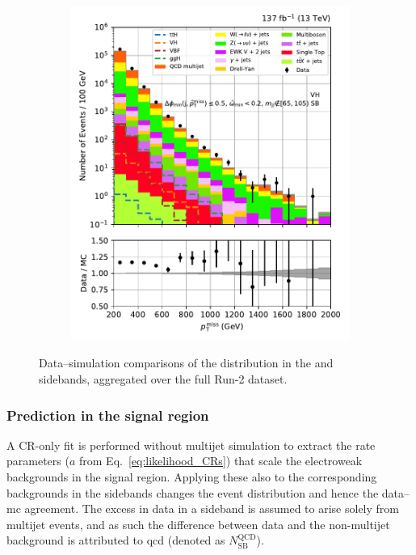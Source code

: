 \begin{figure}[htbp]
\begin{subfigure}[b]{0.45\textwidth}
        \includegraphics[width=\textwidth]{figures/region_plots/full_Run2/sideband/VH.pdf}
        \caption{\VH}
    \end{subfigure}
    \caption[Data--simulation comparisons of the \ptmiss distribution in the \ttH and \VH sidebands, aggregated over the full Run-2 dataset]{Data--simulation comparisons of the \ptmiss distribution in the \ttH and \VH sidebands, aggregated over the full Run-2 dataset.}
    \label{fig:htoinv_sb_yields_combRun2}
\end{figure}




\subsubsection{Prediction in the signal region}
\label{subsubsec:htoinv_qcd_pred_SR}

A \gls{CR}-only fit is performed without multijet simulation to extract the rate parameters ($a$ from Eq.~\ref{eq:likelihood_CRs}) that scale the electroweak backgrounds in the signal region. Applying these also to the corresponding backgrounds in the sidebands changes the event distribution and hence the data--\acrshort{mc} agreement. The excess in data in a sideband is assumed to arise solely from multijet events, and as such the difference between data and the non-multijet background is attributed to \acrshort{qcd} (denoted as $N_{\mathrm{SB}}^{\mathrm{QCD}}$).

